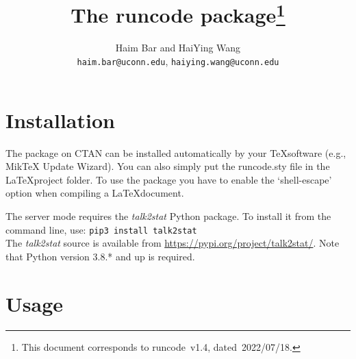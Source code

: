 \documentclass{ltxdoc}
\begin{document}
    \title{The \textsf{runcode} package\thanks{This document  corresponds to \textsf{runcode}~v1.4, dated~2022/07/18.}}
    \author{Haim Bar and HaiYing Wang \\ \texttt{haim.bar@uconn.edu}, \texttt{haiying.wang@uconn.edu}}
    \maketitle


\section{Installation}
The package on CTAN can be installed automatically by your \TeX\space software (e.g., MikTeX Update Wizard). You can also simply put the runcode.sty file in the \LaTeX\space project folder. To use the package you have to enable the `shell-escape' option when compiling a \LaTeX\space document.
	
The server mode requires the \textit{talk2stat} Python package. To install it from the command line, use:
\verb|pip3 install talk2stat|\\
The \textit{talk2stat} source is available from \url{https://pypi.org/project/talk2stat/}.
Note that Python version 3.8.* and up is required.

\section{Usage}
\end{document}
